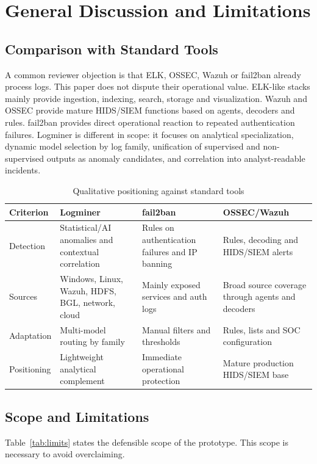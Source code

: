 \documentclass[conference]{IEEEtran}
\newcommand{\logminer}{Logminer}
\begin{document}
\section{General Discussion and Limitations}
\subsection{Comparison with Standard Tools}
A common reviewer objection is that ELK, OSSEC, Wazuh or fail2ban already process logs. This paper does not dispute their operational value. ELK-like stacks mainly provide ingestion, indexing, search, storage and visualization. Wazuh and OSSEC provide mature HIDS/SIEM functions based on agents, decoders and rules. fail2ban provides direct operational reaction to repeated authentication failures. \logminer{} is different in scope: it focuses on analytical specialization, dynamic model selection by log family, unification of supervised and non-supervised outputs as anomaly candidates, and correlation into analyst-readable incidents.

\begin{table}[t]
\caption{Qualitative positioning against standard tools}
\label{tab:tools}
\centering
\scriptsize
\begin{tabularx}{\linewidth}{p{1.6cm}X X X}
\toprule
\textbf{Criterion} & \textbf{Logminer} & \textbf{fail2ban} & \textbf{OSSEC/Wazuh} \\
\midrule
Detection & Statistical/AI anomalies and contextual correlation & Rules on authentication failures and IP banning & Rules, decoding and HIDS/SIEM alerts \\
Sources & Windows, Linux, Wazuh, HDFS, BGL, network, cloud & Mainly exposed services and auth logs & Broad source coverage through agents and decoders \\
Adaptation & Multi-model routing by family & Manual filters and thresholds & Rules, lists and SOC configuration \\
Positioning & Lightweight analytical complement & Immediate operational protection & Mature production HIDS/SIEM base \\
\bottomrule
\end{tabularx}
\end{table}

\subsection{Scope and Limitations}
Table~\ref{tab:limits} states the defensible scope of the prototype. This scope is necessary to avoid overclaiming.
\end{document}
